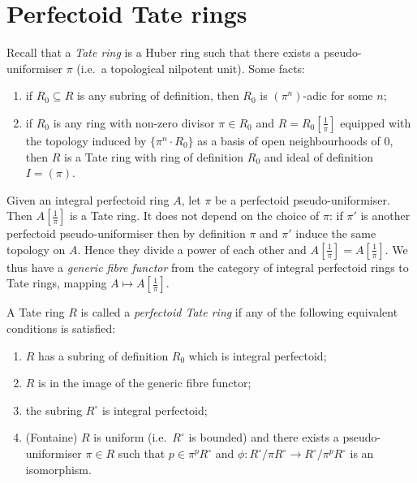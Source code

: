 \documentclass[a4paper]{article}
\begin{document}
\section{Perfectoid Tate rings}

Recall that a \emph{Tate ring} is a Huber ring such that there exists a pseudo-uniformiser \(\pi\) (i.e.\ a topological nilpotent unit). Some facts:
\begin{enumerate}
\item if \(R_0 \subseteq R\) is any subring of definition, then \(R_0\) is \((\pi^n)\)-adic for some \(n\);
\item if \(R_0\) is any ring with non-zero divisor \(\pi \in R_0\) and \(R = R_0[\frac{1}{\pi}]\) equipped with the topology induced by \(\{\pi^n \cdot R_0\}\) as a basis of open neighbourhoods of \(0\), then \(R\) is a Tate ring with ring of definition \(R_0\) and ideal of definition \(I = (\pi)\).
\end{enumerate}

Given an integral perfectoid ring \(A\), let \(\pi\) be a perfectoid pseudo-uniformiser. Then \(A[\frac{1}{\pi}]\) is a Tate ring. It does not depend on the choice of \(\pi\): if \(\pi'\) is another perfectoid pseudo-uniformiser then by definition \(\pi\) and \(\pi'\) induce the same topology on \(A\). Hence they divide a power of each other and \(A[\frac{1}{\pi}] = A[\frac{1}{\pi}]\). We thus have a \emph{generic fibre functor} from the category of integral perfectoid rings to Tate rings, mapping \(A \mapsto A[\frac{1}{\pi}]\).

\begin{definition}
  A Tate ring \(R\) is called a \emph{perfectoid Tate ring} if any of the following equivalent conditions is satisfied:
  \begin{enumerate}
  \item \(R\) has a subring of definition \(R_0\) which is integral perfectoid;
  \item \(R\) is in the image of the generic fibre functor;
  \item the subring \(R^\circ\) is integral perfectoid;
  \item (Fontaine) \(R\) is uniform (i.e.\ \(R^\circ\) is bounded) and there exists a pseudo-uniformiser \(\pi \in R\) such that \(p \in \pi^p R^\circ\) and \(\phi: R^\circ/\pi R^\circ \to R^\circ/\pi^p R^\circ\) is an isomorphism.
  \end{enumerate}
\end{definition}
\end{document}
